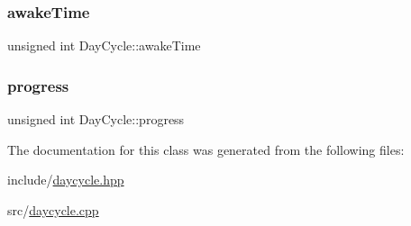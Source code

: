 \mbox{\label{classDayCycle_ac53e82e6492f02405b3336bf9ac3c606_ac53e82e6492f02405b3336bf9ac3c606}} 
\subsubsection{\texorpdfstring{awake\+Time}{awakeTime}}
{\footnotesize\ttfamily unsigned int Day\+Cycle\+::awake\+Time\hspace{0.3cm}{\ttfamily [private]}}

\mbox{\label{classDayCycle_ac1a08b3deca37cf2f182406d956876f3_ac1a08b3deca37cf2f182406d956876f3}} 
\subsubsection{\texorpdfstring{progress}{progress}}
{\footnotesize\ttfamily unsigned int Day\+Cycle\+::progress\hspace{0.3cm}{\ttfamily [private]}}



The documentation for this class was generated from the following files\+:\begin{DoxyCompactItemize}
\item 
include/\hyperlink{daycycle_8hpp}{daycycle.\+hpp}\item 
src/\hyperlink{daycycle_8cpp}{daycycle.\+cpp}\end{DoxyCompactItemize}

